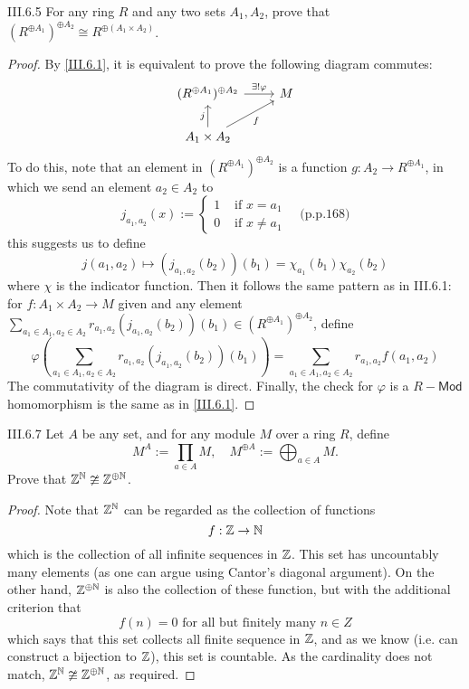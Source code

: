 \begin{problem}{III.6.5}
For any ring $R$ and any two sets $A_1, A_2$, prove that $(R^{\oplus A_1})^{\oplus A_2} \cong R^{\oplus(A_1 \times A_2)}$.
\end{problem}
\begin{proof}
By \ref{III.6.1}, it is equivalent to prove the following diagram commutes:
\[
\begin{tikzcd}
(R^{\oplus A_1})^{\oplus A_2} \arrow[r, "\exists!\varphi"] & M \\
A_1 \times A_2 \arrow[ru, "f"'] \arrow[u, "j"]             &  
\end{tikzcd}
\]
To do this, note that an element in $(R^{\oplus A_1})^{\oplus A_2}$ is a function $g : A_2 \to R^{\oplus A_1}$, in which we send an element $a_2 \in A_2$ to 
\[
j_{a_1, a_2}(x) := \begin{cases}
1 &\text{ if } x = a_1 \\
0 &\text{ if } x \neq a_1 
\end{cases}	\quad \text{(p.p.168)}
\]
this suggests us to define
\[
j(a_1,a_2) \mapsto (j_{a_1,a_2}(b_2))(b_1) = \chi_{a_1}(b_1)\chi_{a_2}(b_2)	
\]
where $\chi$ is the indicator function. Then it follows the same pattern as in III.6.1: for $f : A_1 \times A_2 \to M$ given and any element $\sum_{a_1 \in A_1, a_2 \in A_2} r_{a_1,a_2} (j_{a_1,a_2}(b_2))(b_1) \in (R^{\oplus A_1})^{\oplus A_2}$, define
\[
\varphi \left(\sum_{a_1 \in A_1, a_2 \in A_2} r_{a_1,a_2} (j_{a_1,a_2}(b_2))(b_1)\right) = \sum_{a_1 \in A_1, a_2 \in A_2} r_{a_1,a_2} f(a_1,a_2)
\]
The commutativity of the diagram is direct. Finally, the check for $\varphi$ is a $R-\mathsf{Mod}$ homomorphism is the same as in \ref{III.6.1}.
\end{proof}

\begin{problem}{III.6.7}
Let $A$ be any set, and for any module $M$ over a ring $R$, define 
\[
M^A	:= \prod_{a \in A}M, \quad M^{\oplus A} := \bigoplus_{a \in A}M.
\]
Prove that $\mathbb{Z}^{\mathbb{N}} \ncong \mathbb{Z}^{\oplus \mathbb{N}}$.
\end{problem}
\begin{proof}
Note that $\mathbb{Z}^{\mathbb{N}}$ can be regarded as the collection of functions
\[
f: \mathbb{Z} \to \mathbb{N} 
\]
which is the collection of all infinite sequences in $\mathbb{Z}$. This set has uncountably many elements (as one can argue using Cantor's diagonal argument). On the other hand, $\mathbb{Z}^{\oplus \mathbb{N}}$ is also the collection of these function, but with the additional criterion that
\[
f(n) = 0 \text{ for all but finitely many }	n \in Z
\]
which says that this set collects all finite sequence in $\mathbb{Z}$, and as we know (i.e. can construct a bijection to $\mathbb{Z}$), this set is countable. As the cardinality does not match, $\mathbb{Z}^{\mathbb{N}} \ncong \mathbb{Z}^{\oplus \mathbb{N}}$, as required.
\end{proof}

